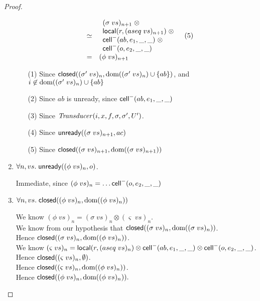\begin{proof}
\begin{enumerate}
\begin{displaymath}
\begin{array}{lcll}
    & \simeq & \begin{array}{l}
                (\sigma\;vs)_{n+1} \;\otimes \\
                \mathsf{local}({r}, {(aseq\;vs)_{n+1}}) \;\otimes \\
                \mathsf{cell}^{-}({ab}, {e_1}, {\_}, {\_}) \;\otimes \\
                \mathsf{cell}^{-}({o}, {e_2}, {\_}, {\_}) \\
              \end{array}
    & (5) \\ 
    & = & (\phi\;vs)_{n+1}
  \end{array}
\end{displaymath}
  \begin{itemize}
  \item[(1)] Since $\mathsf{closed}({(\sigma'\;vs)_n}, {\mbox{dom}({(\sigma'\;vs)_n}) \cup \{{ab}\}})$, and 
             $i \not \in \mbox{dom}({(\sigma'\;vs)_n}) \cup \{{ab}\}$
  \item[(2)] Since $ab$ is unready, since $\mathsf{cell}^{-}({ab}, {e_1}, {\_}, {\_})$
  \item[(3)] Since $\mathit{Transducer}(i, x, f, \sigma, \sigma', U')$.
  \item[(4)] Since $\mathsf{unready}({(\sigma\;vs)_{n+1}}, {ac})$ 
  \item[(5)] Since $\mathsf{closed}({(\sigma\;vs)_{n+1}}, {\mbox{dom}({(\sigma\;vs)_{n+1}})})$
  \end{itemize}

\item $\forall n, vs.\; \mathsf{unready}({(\phi\;vs)_n}, {o})$.

  Immediate, since $(\phi\;vs)_n = \ldots \mathsf{cell}^{-}({o}, {e_2}, {\_}, {\_})$ 

\item $\forall n, vs.\; \mathsf{closed}({(\phi\;vs)_n}, {\mbox{dom}({(\phi\;vs)_n})})$
  
  We know $(\phi\;vs)_n = (\sigma\;vs)_n \otimes (\varsigma\;vs)_n$. \\
  We know from our hypothesis that $\mathsf{closed}({(\sigma\;vs)_n}, {\mbox{dom}({(\sigma\;vs)_n})})$. \\
  Hence $\mathsf{closed}({(\sigma\;vs)_n}, {\mbox{dom}({(\phi\;vs)_n})})$. \\
  We know $(\varsigma\;vs)_n = \mathsf{local}({r}, {(aseq\;vs)_{n}}) \otimes \mathsf{cell}^{-}({ab}, {e_1}, {\_}, {\_}) \otimes \mathsf{cell}^{-}({o}, {e_2}, {\_}, {\_})$. \\
  Hence $\mathsf{closed}({(\varsigma\;vs)_n}, {\emptyset})$. \\
  Hence $\mathsf{closed}({(\varsigma\;vs)_n}, {\mbox{dom}({(\phi\;vs)_n})})$. \\
  Hence $\mathsf{closed}({(\phi\;vs)_n}, {\mbox{dom}({(\phi\;vs)_n})}).$



\end{enumerate}
\end{proof}
